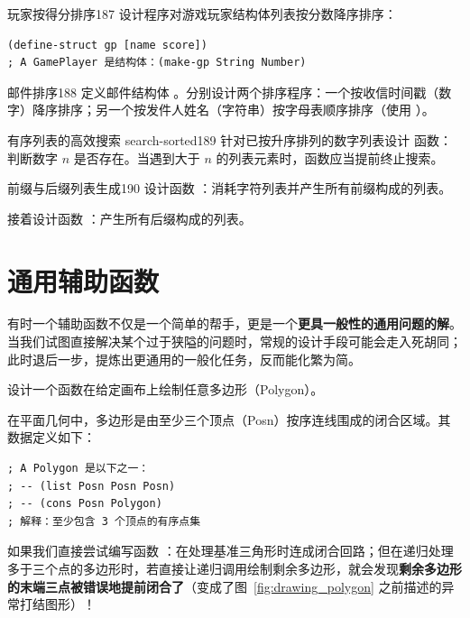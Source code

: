 \begin{exercise}{玩家按得分排序}{187}
设计程序对游戏玩家结构体列表按分数降序排序：
\begin{lstlisting}[language=BSL]
(define-struct gp [name score])
; A GamePlayer 是结构体：(make-gp String Number)
\end{lstlisting}
\end{exercise}

\begin{exercise}{邮件排序}{188}
定义邮件结构体 。分别设计两个排序程序：一个按收信时间戳（数字）降序排序；另一个按发件人姓名（字符串）按字母表顺序排序（使用 ）。
\end{exercise}

\begin{exercise}{有序列表的高效搜索 search-sorted}{189}
针对已按升序排列的数字列表设计  函数：判断数字 $n$ 是否存在。当遇到大于 $n$ 的列表元素时，函数应当提前终止搜索。
\end{exercise}

\begin{exercise}{前缀与后缀列表生成}{190}
设计函数 ：消耗字符列表并产生所有前缀构成的列表。

接着设计函数 ：产生所有后缀构成的列表。
\end{exercise}

\section{通用辅助函数}
\label{sec:ch11_auxiliary_generalize}

有时一个辅助函数不仅是一个简单的帮手，更是一个\textbf{更具一般性的通用问题的解}。当我们试图直接解决某个过于狭隘的问题时，常规的设计手段可能会走入死胡同；此时退后一步，提炼出更通用的一般化任务，反而能化繁为简。

\begin{notebox}[例题：在画布中绘制多边形]
设计一个函数在给定画布上绘制任意多边形（Polygon）。
\end{notebox}

在平面几何中，多边形是由至少三个顶点（Posn）按序连线围成的闭合区域。其数据定义如下：
\begin{lstlisting}[language=BSL]
; A Polygon 是以下之一：
; -- (list Posn Posn Posn)
; -- (cons Posn Polygon)
; 解释：至少包含 3 个顶点的有序点集
\end{lstlisting}

如果我们直接尝试编写函数 ：在处理基准三角形时连成闭合回路；但在递归处理多于三个点的多边形时，若直接让递归调用绘制剩余多边形，就会发现\textbf{剩余多边形的末端三点被错误地提前闭合了}（变成了图~\ref{fig:drawing_polygon} 之前描述的异常打结图形）！

